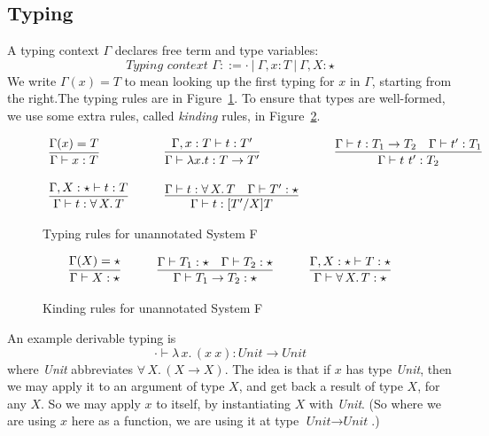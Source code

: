 \documentclass{article}
\begin{document}
\subsection{Typing}

A typing context $\Gamma$ declares free term and type variables:
\[
\textit{Typing context }\Gamma ::= \cdot\ |\ \Gamma, x:T\ |\ \Gamma, X : \star
\]
We write $\Gamma(x) = T$ to mean looking up the first typing for $x$ in $\Gamma$,
starting from the right.The typing rules are in
Figure~\ref{fig:tp}.  To ensure that types are well-formed, we
use some extra rules, called \emph{kinding} rules, in Figure~\ref{fig:knd}.  

\begin{figure}
\[
\begin{array}{lllll}
\infer{\Gamma \vdash x : T}{\Gamma(x) = T} &\ \ \ &
\infer{\Gamma \vdash \lambda x . t : T \to T'}{\Gamma, x : T \vdash t : T'} &\ \ \ &
\infer{\Gamma \vdash t\ t' : T_2}{\Gamma \vdash t : T_1 \to T_2 & \Gamma \vdash t' : T_1} \\ \\
\infer{\Gamma \vdash t : \forall \,X.\,T}{\Gamma,X : \star \vdash t : T} &\ \ \ &
\infer{\Gamma \vdash t : [T'/X]T}{\Gamma \vdash t : \forall\, X.\,T & \Gamma \vdash T' : \star} &\ \ \ &\ 
\end{array}
\]
\caption{Typing rules for unannotated System F}
\label{fig:tp}
\end{figure}

\begin{figure}
\[
\begin{array}{lllll}
\infer{\Gamma \vdash X : \star}{\Gamma(X) = \star} &\ \ \ &
\infer{\Gamma \vdash T_1 \to T_2 : \star}{\Gamma \vdash T_1 : \star & \Gamma \vdash T_2 : \star} &\ \ \ &
\infer{\Gamma \vdash \forall\, X.\,T : \star}{\Gamma,X : \star \vdash T : \star}
\end{array}
\]
\caption{Kinding rules for unannotated System F}
\label{fig:knd}
\end{figure}

An example derivable typing is
\[
\cdot \vdash \lambda\,x.\,(x\ x) : \textit{Unit} \to \textit{Unit}
\]
\noindent where \textit{Unit} abbreviates $\forall\,X.\,(X \to X)$.  The
idea is that if $x$ has type \textit{Unit}, then we may apply it to an argument
of type $X$, and get back a result of type $X$, for any $X$.  So we may apply $x$
to itself, by instantiating $X$ with \textit{Unit}.  (So where we are using $x$ here
as a function, we are using it at type $\textit{Unit} \to \textit{Unit}$.)
\end{document}

